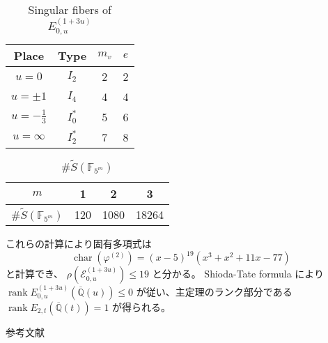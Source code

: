 \documentclass{classes/mybeamer}
\DeclareMathOperator{\rank}{rank}
\DeclareMathOperator{\chara}{char}
\begin{document}
\begin{frame}
    \begin{table}[ht]
        \centering
        \caption{Singular fibers of $E_{0,u}^{(1 + 3u)}$}
        \begin{tabular}{|c|c|c|c|}
            \hline
            Place            & Type    & $m_v$ & $e$ \\
            \hline
            $u=0$            & $I_2$   & 2     & 2   \\
            $u=\pm 1$        & $I_4$   & 4     & 4   \\
            $u=-\frac{1}{3}$ & $I_0^*$ & 5     & 6   \\
            $u=\infty$       & $I_2^*$ & 7     & 8   \\
            \hline
        \end{tabular}
        \label{tab:E_{0,u}^{(1 + 3u)}}
    \end{table}

    \begin{table}[ht]
        \centering
        \caption{$\# \tilde{S}(\mathbb{F}_{5^{m}})$}
        \begin{tabular}{|c|c|c|c|}
            \hline
            $m$                              & 1   & 2    & 3     \\
            \hline
            $\# \tilde{S}(\mathbb{F}_{5^m})$ & 120 & 1080 & 18264 \\
            \hline
        \end{tabular}
        \label{tab:tm}
    \end{table}
    これらの計算により固有多項式は
    \begin{equation*}
        \chara(\varphi^{(2)}) = (x - 5)^{19}(x^{3} + x^{2} + 11 x - 77)
    \end{equation*}
    と計算でき、 $\rho(\mathcal{E}_{0,u}^{(1 + 3u)}) \leq 19$ と分かる。
    Shioda-Tate formula により $\rank E_{0,u}^{(1 + 3u)}(\overline{\mathbb{Q}}(u)) \leq 0$ が従い、主定理のランク部分である $\rank E_{2,t}(\overline{\mathbb{Q}}(t)) = 1$ が得られる。
\end{frame}

\begin{frame}{参考文献}
    \scriptsize
    \beamertemplatetextbibitems
    
    
\end{frame}
\end{document}
